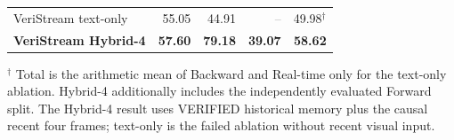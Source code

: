 \begin{table}[t]
{\begin{tabular}{lrrrr}
    VeriStream text-only                       & 55.05 & 44.91 & \textcolor{gray}{--} & 49.98$^{\dagger}$ \\
    \textbf{VeriStream Hybrid-4}                & \textbf{57.60} & \textbf{79.18} & \textbf{39.07} & \textbf{58.62} \\
    \bottomrule
  \end{tabular}%
  }
  \parbox{\linewidth}{\footnotesize
  $^{\dagger}$ Total is the arithmetic mean of Backward and Real-time only for the text-only
  ablation. Hybrid-4 additionally includes the independently evaluated Forward split. The
  Hybrid-4 result uses VERIFIED historical memory plus the causal recent four frames; text-only
  is the failed ablation without recent visual input.}
\end{table}
